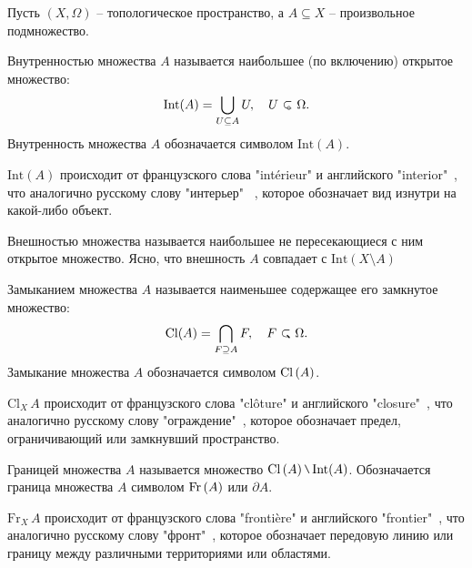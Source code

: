Пусть \( (X, \Omega)\) -- топологическое пространство, а \( A \subseteq X \) -- произвольное подмножество.
\begin{definition}
	Внутренностью множества \( A \) называется наибольшее (по включению) открытое множество:
	\begin{equation*}
		\mathrm{Int}(A) = \bigcup_{U \subseteq A} U, \quad U \open \Omega.
	\end{equation*}
		Внутренность множества \( A \) обозначается символом \( \text{Int}( A) \).
\end{definition}

\begin{remark}
	\(\text{Int} (A) \) происходит от французского слова "intérieur" и английского "interior"\ , что аналогично русскому слову "интерьер" \ , которое обозначает вид изнутри на какой-либо объект.
\end{remark}

Внешностью множества называется наибольшее не пересекающиеся с ним открытое множество. Ясно, что внешность $A$ совпадает с $\mathrm{Int}(X \setminus A)$

\begin{definition}
	 Замыканием множества \( A \) называется наименьшее содержащее его замкнутое множество:
	 \begin{equation*}
		\mathrm{Cl}(A) = \bigcap_{F \supseteq A} F, \quad F \closed \Omega.
	 \end{equation*}
	Замыкание множества \( A \) обозначается символом \( \mathrm{Cl}\left(A\right) \).
\end{definition}


\begin{remark}
\( \text{Cl}_X \, A \) происходит от французского слова "clôture" и английского "closure"\ , что аналогично русскому слову "ограждение"\ , которое обозначает предел, ограничивающий или замкнувший пространство.
\end{remark}



\begin{definition}
	Границей множества \( A \) называется множество \( \cl{A} \setminus \mathrm{Int}(A) \). Обозначается граница множества \( A \) символом \( \mathrm{Fr}\left(A\right) \) или \(\partial A\).
\end{definition}

\begin{remark}
\( \text{Fr}_X \, A \) происходит от французского слова "frontière" и английского "frontier"\ , что аналогично русскому слову "фронт"\ , которое обозначает передовую линию или границу между различными территориями или областями.
\end{remark}

